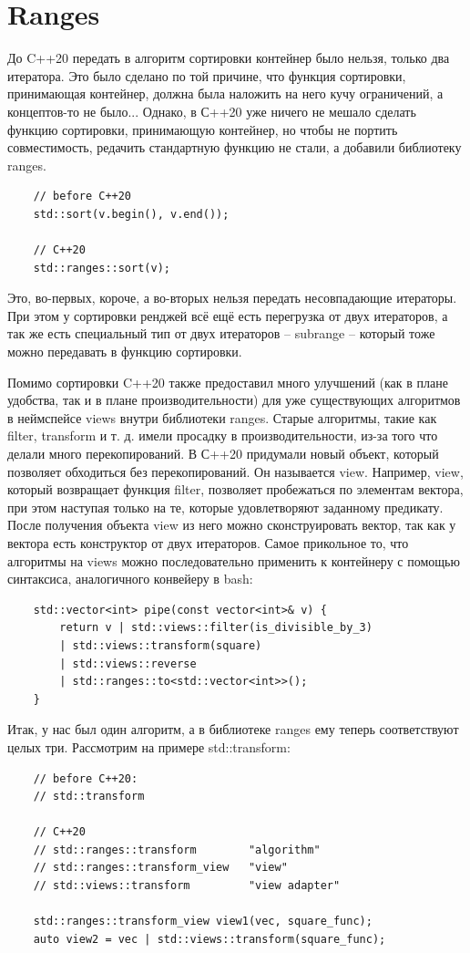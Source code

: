 \documentclass[12pt, a4paper]{article}
\begin{document}
\section{Ranges}
До C++20 передать в алгоритм сортировки контейнер было нельзя, только два итератора. Это было сделано по той причине, что функция сортировки, принимающая контейнер, должна была наложить на него кучу ограничений, а концептов-то не было... Однако, в С++20 уже ничего не мешало сделать функцию сортировки, принимающую контейнер, но чтобы не портить совместимость, редачить стандартную функцию не стали, а добавили библиотеку ranges.
\begin{verbatim}
	// before C++20
	std::sort(v.begin(), v.end());
	
	// C++20
	std::ranges::sort(v);
\end{verbatim}
Это, во-первых, короче, а во-вторых нельзя передать несовпадающие итераторы. При этом у сортировки ренджей всё ещё есть перегрузка от двух итераторов, а так же есть специальный тип от двух итераторов -- subrange -- который тоже можно передавать в функцию сортировки.\\
\par Помимо сортировки C++20 также предоставил много улучшений (как в плане удобства, так и в плане производительности) для уже существующих алгоритмов в неймспейсе views внутри библиотеки ranges. Старые алгоритмы, такие как filter, transform и т. д. имели просадку в производительности, из-за того что делали много перекопирований. В С++20 придумали новый объект, который позволяет обходиться без перекопирований. Он называется view. Например, view, который возвращает функция filter, позволяет пробежаться по элементам вектора, при этом наступая только на те, которые удовлетворяют заданному предикату. После получения объекта view из него можно сконструировать вектор, так как у вектора есть конструктор от двух итераторов. Самое прикольное то, что алгоритмы на views можно последовательно применить к контейнеру с помощью синтаксиса, аналогичного конвейеру в bash:
\begin{verbatim}
	std::vector<int> pipe(const vector<int>& v) {
		return v | std::views::filter(is_divisible_by_3)
		| std::views::transform(square)
		| std::views::reverse
		| std::ranges::to<std::vector<int>>();
	}
\end{verbatim}
Итак, у нас был один алгоритм, а в библиотеке ranges ему теперь соответствуют целых три. Рассмотрим на примере std::transform:
\begin{verbatim}
	// before C++20:
	// std::transform
	
	// C++20
	// std::ranges::transform        "algorithm"
	// std::ranges::transform_view   "view"
	// std::views::transform         "view adapter"
	
	std::ranges::transform_view view1(vec, square_func);
	auto view2 = vec | std::views::transform(square_func);
\end{verbatim}
\end{document}
